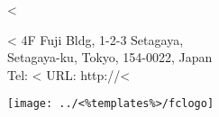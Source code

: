 \parbox[t]{.50\textwidth}{
\vspace{0.3cm}
<%
}
\parbox[t]{.38\textwidth}{
\vspace{0.3cm}
	{\Large <%
	 \normalsize 4F Fuji Bldg, 1-2-3 Setagaya, \\
	 Setagaya-ku, Tokyo, 154-0022, Japan \\
   Tel: <%
   URL: http://<%
	 }
}
\parbox[t]{.10\textwidth}{
\vspace{0.2cm}
   \texttt{[image: ../<\%templates\%>/fclogo]}
}